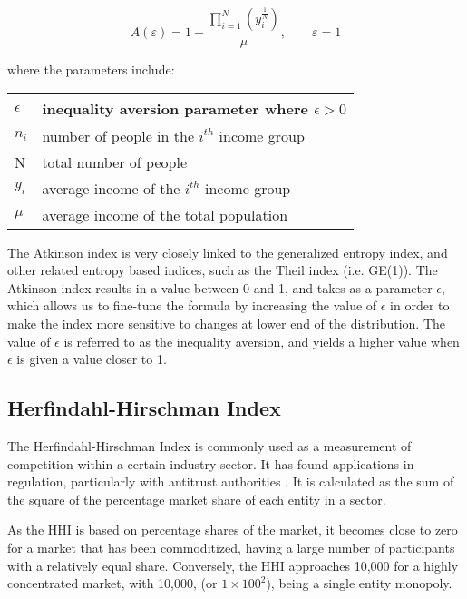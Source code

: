 \documentclass[conference]{IEEEtran}
\begin{document}
\[A\left( \varepsilon \right)=1-\frac{\prod_{i=1}^{N}\left( y_{i}^{\frac{1}{N}} \right)}{\mu}, \quad \quad \varepsilon=1\]

\vspace{12pt}

where the parameters include:

\vspace{6pt}

\begin{center}
\begin{tabular}{|l|l|}
\hline
$\epsilon$ & inequality aversion parameter where $\epsilon>0$ \\ \hline
$n_{i}$ & number of people in the $i^{th}$ income group \\ \hline
N & total number of people \\ \hline
$y_{i}$ & average income of the $i^{th}$ income group \\ \hline
$\mu$ & average income of the total population \\ \hline
\end{tabular}
\end{center}

\vspace{6pt}

The Atkinson index is very closely linked to the generalized entropy index, and other related entropy based indices, such as the Theil index (i.e. GE(1)).  The Atkinson index results in a value between 0 and 1, and takes as a parameter $\epsilon$, which allows us to fine-tune the formula by increasing the value of $\epsilon$ in order to make the index more sensitive to changes at lower end of the distribution.  The value of $\epsilon$ is referred to as the inequality aversion, and yields a higher value when $\epsilon$ is given a value closer to 1.

\subsection{Herfindahl-Hirschman Index}

The Herfindahl-Hirschman Index is commonly used as a measurement of competition within a certain industry sector. It has found applications in regulation, particularly with antitrust authorities \cite{usdoj2015}. It is calculated as the sum of the square of the percentage market share of each entity in a sector.

As the HHI is based on percentage shares of the market, it becomes close to zero for a market that has been commoditized, having a large number of participants with a relatively equal share.  Conversely, the HHI approaches 10,000 for a highly concentrated market, with 10,000, (or $1 \times 100^2 $), being a single entity monopoly.
\end{document}
